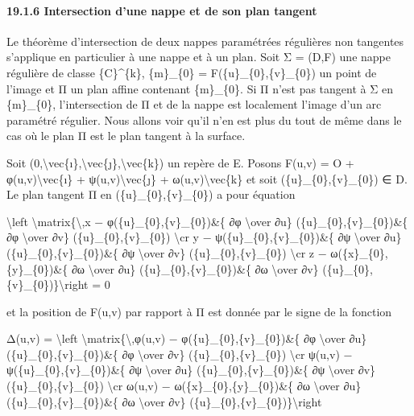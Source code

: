 \documentclass[]{article}
\begin{document}
\paragraph{19.1.6 Intersection d'une nappe et de son plan tangent}

Le théorème d'intersection de deux nappes paramétrées régulières non
tangentes s'applique en particulier à une nappe et à un plan. Soit Σ =
(D,F) une nappe régulière de classe \{C\}\^{}\{k\}, \{m\}\_\{0\} =
F(\{u\}\_\{0\},\{v\}\_\{0\}) un point de l'image et Π un plan affine
contenant \{m\}\_\{0\}. Si Π n'est pas tangent à Σ en \{m\}\_\{0\},
l'intersection de Π et de la nappe est localement l'image d'un arc
paramétré régulier. Nous allons voir qu'il n'en est plus du tout de même
dans le cas où le plan Π est le plan tangent à la surface.

Soit
(0,\textbackslash{}vec\{ı\},\textbackslash{}vec\{ȷ\},\textbackslash{}vec\{k\})
un repère de E. Posons F(u,v) = O + φ(u,v)\textbackslash{}vec\{ı\} +
ψ(u,v)\textbackslash{}vec\{ȷ\} + ω(u,v)\textbackslash{}vec\{k\} et soit
(\{u\}\_\{0\},\{v\}\_\{0\}) ∈ D. Le plan tangent Π en
(\{u\}\_\{0\},\{v\}\_\{0\}) a pour équation

\textbackslash{}left
\textbar{}\textbackslash{}matrix\{\textbackslash{},x −
φ(\{u\}\_\{0\},\{v\}\_\{0\})\&\{ ∂φ \textbackslash{}over ∂u\}
(\{u\}\_\{0\},\{v\}\_\{0\})\&\{ ∂φ \textbackslash{}over ∂v\}
(\{u\}\_\{0\},\{v\}\_\{0\}) \textbackslash{}cr y −
ψ(\{u\}\_\{0\},\{v\}\_\{0\})\&\{ ∂ψ \textbackslash{}over ∂u\}
(\{u\}\_\{0\},\{v\}\_\{0\})\&\{ ∂ψ \textbackslash{}over ∂v\}
(\{u\}\_\{0\},\{v\}\_\{0\}) \textbackslash{}cr z −
ω(\{x\}\_\{0\},\{y\}\_\{0\})\&\{ ∂ω \textbackslash{}over ∂u\}
(\{u\}\_\{0\},\{v\}\_\{0\})\&\{ ∂ω \textbackslash{}over ∂v\}
(\{u\}\_\{0\},\{v\}\_\{0\})\}\textbackslash{}right \textbar{} = 0

et la position de F(u,v) par rapport à Π est donnée par le signe de la
fonction

Δ(u,v) = \textbackslash{}left
\textbar{}\textbackslash{}matrix\{\textbackslash{},φ(u,v) −
φ(\{u\}\_\{0\},\{v\}\_\{0\})\&\{ ∂φ \textbackslash{}over ∂u\}
(\{u\}\_\{0\},\{v\}\_\{0\})\&\{ ∂φ \textbackslash{}over ∂v\}
(\{u\}\_\{0\},\{v\}\_\{0\}) \textbackslash{}cr ψ(u,v) −
ψ(\{u\}\_\{0\},\{v\}\_\{0\})\&\{ ∂ψ \textbackslash{}over ∂u\}
(\{u\}\_\{0\},\{v\}\_\{0\})\&\{ ∂ψ \textbackslash{}over ∂v\}
(\{u\}\_\{0\},\{v\}\_\{0\}) \textbackslash{}cr ω(u,v) −
ω(\{x\}\_\{0\},\{y\}\_\{0\})\&\{ ∂ω \textbackslash{}over ∂u\}
(\{u\}\_\{0\},\{v\}\_\{0\})\&\{ ∂ω \textbackslash{}over ∂v\}
(\{u\}\_\{0\},\{v\}\_\{0\})\}\textbackslash{}right \textbar{}
\end{document}
